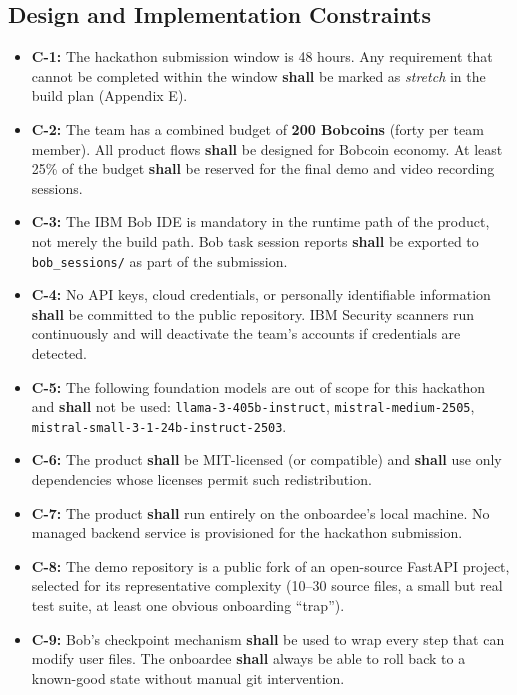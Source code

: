 \documentclass[11pt,letterpaper]{article}
\newcommand{\shall}{\textbf{shall}}
\begin{document}
\subsection{Design and Implementation Constraints}

\begin{itemize}
  \item \textbf{C-1:} The hackathon submission window is 48 hours. Any requirement that cannot be completed within the window \shall{} be marked as \textit{stretch} in the build plan (Appendix E).
  \item \textbf{C-2:} The team has a combined budget of \textbf{200 Bobcoins} (forty per team member). All product flows \shall{} be designed for Bobcoin economy. At least 25\% of the budget \shall{} be reserved for the final demo and video recording sessions.
  \item \textbf{C-3:} The IBM Bob IDE is mandatory in the runtime path of the product, not merely the build path. Bob task session reports \shall{} be exported to \texttt{bob\_sessions/} as part of the submission.
  \item \textbf{C-4:} No API keys, cloud credentials, or personally identifiable information \shall{} be committed to the public repository. IBM Security scanners run continuously and will deactivate the team's accounts if credentials are detected.
  \item \textbf{C-5:} The following foundation models are out of scope for this hackathon and \shall{} not be used: \texttt{llama-3-405b-instruct}, \texttt{mistral-medium-2505}, \texttt{mistral-small-3-1-24b-instruct-2503}.
  \item \textbf{C-6:} The product \shall{} be MIT-licensed (or compatible) and \shall{} use only dependencies whose licenses permit such redistribution.
  \item \textbf{C-7:} The product \shall{} run entirely on the onboardee's local machine. No managed backend service is provisioned for the hackathon submission.
  \item \textbf{C-8:} The demo repository is a public fork of an open-source FastAPI project, selected for its representative complexity (10--30 source files, a small but real test suite, at least one obvious onboarding ``trap'').
  \item \textbf{C-9:} Bob's checkpoint mechanism \shall{} be used to wrap every step that can modify user files. The onboardee \shall{} always be able to roll back to a known-good state without manual git intervention.
\end{itemize}
\end{document}
